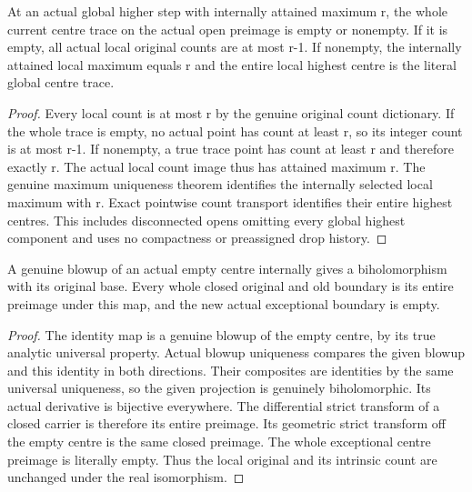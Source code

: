 \begin{lemma}
\label{hir:general-nc-open-highest-trace-dichotomy}
\leanok
At an actual global higher step with internally attained maximum r, the whole
current centre trace on the actual open preimage is empty or nonempty. If it
is empty, all actual local original counts are at most r-1. If nonempty, the
internally attained local maximum equals r and the entire local highest centre
is the literal global centre trace.
\end{lemma}
\begin{proof}
Every local count is at most r by the genuine original count dictionary. If
the whole trace is empty, no actual point has count at least r, so its integer
count is at most r-1. If nonempty, a true trace point has count at least r and
therefore exactly r. The actual local count image thus has attained maximum r.
The genuine maximum uniqueness theorem identifies the internally selected
local maximum with r. Exact pointwise count transport identifies their entire
highest centres. This includes disconnected opens omitting every global
highest component and uses no compactness or preassigned drop history.
\end{proof}

\begin{lemma}
\label{hir:general-nc-open-actual-empty-blowup-isomorphism}
\leanok
A genuine blowup of an actual empty centre internally gives a biholomorphism
with its original base. Every whole closed original and old boundary is its
entire preimage under this map, and the new actual exceptional boundary is empty.
\end{lemma}
\begin{proof}
The identity map is a genuine blowup of the empty centre, by its true analytic
universal property. Actual blowup uniqueness compares the given blowup and
this identity in both directions. Their composites are identities by the same
universal uniqueness, so the given projection is genuinely biholomorphic.
Its actual derivative is bijective everywhere. The differential strict
transform of a closed carrier is therefore its entire preimage. Its geometric
strict transform off the empty centre is the same closed preimage. The whole
exceptional centre preimage is literally empty. Thus the local original and
its intrinsic count are unchanged under the real isomorphism.
\end{proof}

